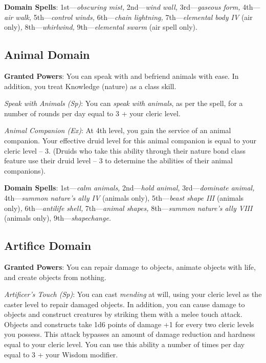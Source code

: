 \textbf{Domain Spells}: 1st---\textit{obscuring mist, }2nd---\textit{wind wall, }3rd---\textit{gaseous form, }4th---\textit{air walk, }5th---\textit{control winds, }6th---\textit{chain lightning, }7th---\textit{elemental body IV} (air only)\textit{, }8th---\textit{whirlwind, }9th---\textit{elemental swarm} (air spell only).
				
\subsection{Animal Domain}

				
\textbf{Granted Powers}: You can speak with and befriend animals with ease. In addition, you treat Knowledge (nature) as a class skill.
				
\textit{Speak with Animals (Sp)}: You can \textit{speak with animals}, as per the spell, for a number of rounds per day equal to 3 + your cleric level. 
				
\textit{Animal Companion (Ex)}: At 4th level, you gain the service of an animal companion. Your effective druid level for this animal companion is equal to your cleric level -- 3. (Druids who take this ability through their nature bond class feature use their druid level -- 3 to determine the abilities of their animal companions).
				
\textbf{Domain Spells}: 1st---\textit{calm animals, }2nd---\textit{hold animal, }3rd---\textit{dominate animal, }4th---\textit{summon nature's ally IV} (animals only), 5th---\textit{beast shape III }(animals only)\textit{, }6th---\textit{antilife shell, }7th---\textit{animal shapes, }8th---\textit{summon nature's ally VIII }(animals only), 9th---\textit{shapechange.}
				
\subsection{Artifice Domain}

				
\textbf{Granted Powers}: You can repair damage to objects, animate objects with life, and create objects from nothing.
				
\textit{Artificer's Touch (Sp)}: You can cast \textit{mending }at will, using your cleric level as the caster level to repair damaged objects. In addition, you can cause damage to objects and construct creatures by striking them with a melee touch attack. Objects and constructs take 1d6 points of damage +1 for every two cleric levels you possess. This attack bypasses an amount of damage reduction and hardness equal to your cleric level. You can use this ability a number of times per day equal to 3 + your Wisdom modifier.
				
